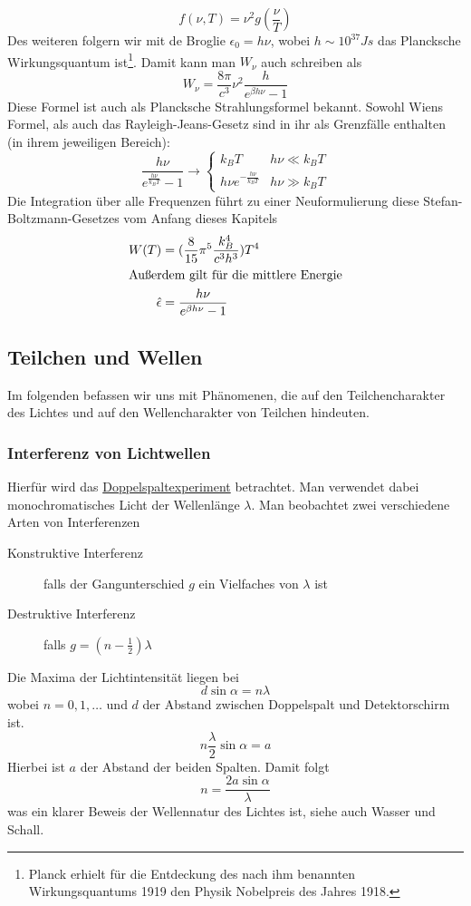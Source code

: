 \documentclass[oneside]{book}
\theoremstyle{definition}
\begin{document}
$$f(\nu, T) = \nu^2 g(\frac{\nu}{T})$$
Des weiteren folgern wir mit de Broglie $\epsilon_0 = h \nu$, wobei  $h \sim 10^{37} Js$ das Plancksche Wirkungsquantum ist\footnote{Planck erhielt für die Entdeckung des nach ihm benannten Wirkungsquantums 1919 den Physik Nobelpreis des Jahres 1918.}. Damit kann man $W_\nu$ auch schreiben als
$$W_\nu = \frac{8\pi}{c^3} \nu^2 \frac{h}{e^{\beta h \nu} - 1}$$
Diese Formel ist auch als Plancksche Strahlungsformel bekannt. Sowohl Wiens Formel, als auch das Rayleigh-Jeans-Gesetz sind in ihr als Grenzfälle enthalten (in ihrem jeweiligen Bereich):
$$\frac{h \nu}{e^{\frac{h\nu}{k_B T}} - 1} \rightarrow \begin{cases}
k_B T & h\nu \ll k_B T\\
h \nu e^{- \frac{h\nu}{k_B T}} & h \nu \gg k_B T
\end{cases}$$
Die Integration über alle Frequenzen führt zu einer Neuformulierung diese Stefan-Boltzmann-Gesetzes vom Anfang dieses Kapitels
\begin{align*}
W(T) &= (\frac{8}{15} \pi^5 \frac{k_B^4}{c^3 h^3}) T^4\\
\intertext{Außerdem gilt für die mittlere Energie}
\hat{\epsilon} &= \frac{h \nu}{e^{\beta h \nu} - 1} 
\end{align*}

\subsection{Teilchen und Wellen}
Im folgenden befassen wir uns mit Phänomenen, die auf den Teilchencharakter des Lichtes und auf den Wellencharakter von Teilchen hindeuten.

\subsubsection{Interferenz von Lichtwellen}
Hierfür wird das \href{https://de.wikipedia.org/wiki/Doppelspaltexperiment}{Doppelspaltexperiment} betrachtet. Man verwendet dabei monochromatisches Licht der Wellenlänge $\lambda$. Man beobachtet zwei verschiedene Arten von Interferenzen
\begin{description}
	\item[Konstruktive Interferenz] falls der Gangunterschied $g$ ein Vielfaches von $\lambda$ ist
	\item[Destruktive Interferenz] falls $g = (n - \frac12) \lambda$
\end{description}
Die Maxima der Lichtintensität liegen bei
$$d \sin \alpha = n\lambda$$
wobei $n = 0, 1, \dots$ und $d$ der Abstand zwischen Doppelspalt und Detektorschirm ist.\
$$n \frac{\lambda}{2} \sin \alpha = a$$
Hierbei ist $a$ der Abstand der beiden Spalten.
Damit folgt 
$$n = \frac{2a \sin \alpha}{\lambda}$$
was ein klarer Beweis der Wellennatur des Lichtes ist, siehe auch Wasser und Schall.
\end{document}
